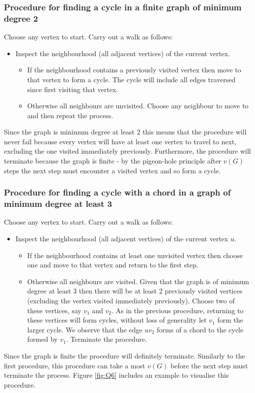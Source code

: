 \documentclass[a4paper]{article}
\begin{document}
\subsubsection*{Procedure for finding a cycle in a finite graph of minimum degree 2}
Choose any vertex to start. Carry out a walk as follows:
\begin{itemize}
    \item
    Inspect the neighbourhood (all adjacent vertices) of the current vertex.
    \begin{itemize}
        \item 
        If the neighbourhood contains a previously visited vertex then move to that vertex to form a cycle. The cycle will include all edges traversed since first visiting that vertex.
        \item
        Otherwise all neighbours are unvisited. Choose any neighbour to move to and then repeat the process.
    \end{itemize}
\end{itemize}
Since the graph is minimum degree at least 2 this means that the procedure will never fail because every vertex will have at least one vertex to travel to next, excluding the one visited immediately previously. Furthermore, the procedure will terminate because the graph is finite - by the pigeon-hole principle after $v(G)$ steps the next step must encounter a visited vertex and so form a cycle.

\subsubsection*{Procedure for finding a cycle with a chord in a graph of minimum degree at least 3}
Choose any vertex to start. Carry out a walk as follows:
\begin{itemize}
    \item
    Inspect the neighbourhood (all adjacent vertices) of the current vertex $u$.
    \begin{itemize}
        \item
        If the neighbourhood contains at least one unvisited vertex then choose one and move to that vertex and return to the first step.
        \item
        Otherwise all neighbours are visited. Given that the graph is of minimum degree at least 3 then there will be at least 2 previously visited vertices (excluding the vertex visited immediately previously). Choose two of these vertices, say $v_1$ and $v_2$. As in the previous procedure, returning to these vertices will form cycles, without loss of generality let $v_1$ form the larger cycle. We observe that the edge $uv_2$ forms of a chord to the cycle formed by $v_1$. Terminate the procedure.
    \end{itemize}
\end{itemize}
Since the graph is finite the procedure will definitely terminate. Similarly to the first procedure, this procedure can take a most $v(G)$ before the next step must terminate the process. Figure \ref{fig:Q6} includes an example to visualise this procedure.
\end{document}

